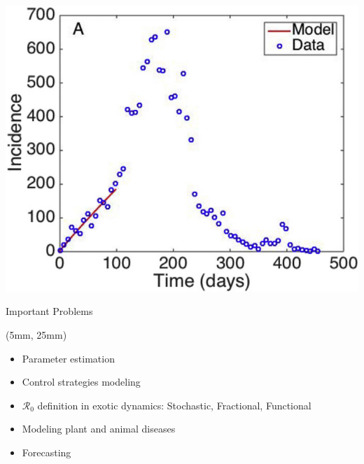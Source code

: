 \begin{frame}{}
    \begin{center}
        \includegraphics[width=.95\linewidth]{assets/DataR_zeroFitting}
    \end{center}
\end{frame}

\begin{frame}{Important Problems}
    \begin{textblock*}{50mm}(5mm, 25mm)
        \begin{itemize}
            \item
                Parameter estimation
            \item
                Control strategies modeling
            \item
                $\mathcal{R}_0$ definition in
             exotic dynamics: 
             Stochastic, Fractional, Functional
            \item
                Modeling plant and animal diseases
            \item
                Forecasting
        \end{itemize}
    \end{textblock*}
\end{frame}


